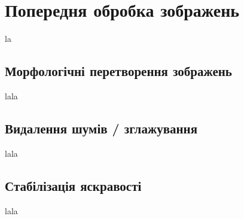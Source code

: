 \section{Попередня обробка зображень}
la
\subsection{Морфологічні перетворення зображень}
lala
\subsection{Видалення шумів / зглажування}
lala
\subsection{Стабілізація яскравості}
lala